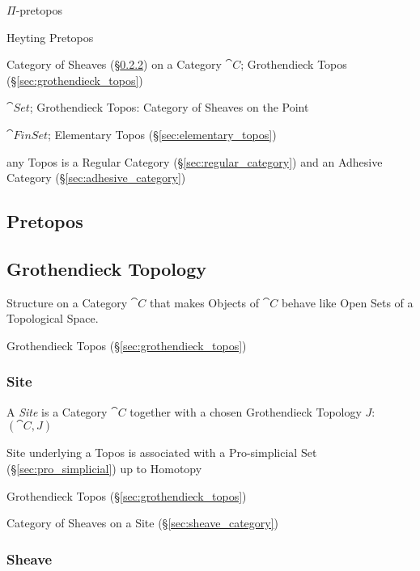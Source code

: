 $\Pi$-pretopos

Heyting Pretopos

Category of Sheaves (\S\ref{sec:sheave}) on a Category $\cat{C}$;
Grothendieck Topos (\S\ref{sec:grothendieck_topos})

$\cat{Set}$; Grothendieck Topos: Category of Sheaves on the Point

$\cat{FinSet}$; Elementary Topos (\S\ref{sec:elementary_topos})

any Topos is a Regular Category (\S\ref{sec:regular_category}) and an
Adhesive Category (\S\ref{sec:adhesive_category})



\subsection{Pretopos}\label{sec:pretopos}

\subsection{Grothendieck Topology}\label{sec:grothendieck_topology}

Structure on a Category $\cat{C}$ that makes Objects of
$\cat{C}$ behave like Open Sets of a Topological Space.

Grothendieck Topos (\S\ref{sec:grothendieck_topos})



\subsubsection{Site}\label{sec:site}

A \emph{Site} is a Category $\cat{C}$ together with a chosen
Grothendieck Topology $J$: $(\cat{C},J)$

Site underlying a Topos is associated with a Pro-simplicial Set
(\S\ref{sec:pro_simplicial}) up to Homotopy

Grothendieck Topos (\S\ref{sec:grothendieck_topos})

Category of Sheaves on a Site (\S\ref{sec:sheave_category})



\subsubsection{Sheave}\label{sec:sheave}

